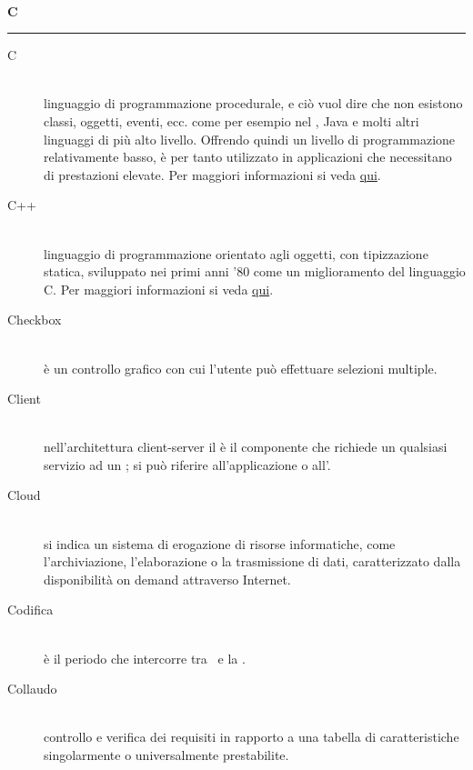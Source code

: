 \documentclass[12pt,a4paper]{article}
\begin{document}
\newpage

\begin{center}
\hfill\\
	\LARGE \textbf{C}
\hfill\\
\rule[15pt]{30pt}{0.5pt}
\end{center}

\begin{description}
\item[C]
\hfill\\ linguaggio di programmazione procedurale, e ciò vuol dire che non esistono classi, oggetti, eventi, ecc. come per esempio nel , Java e molti altri linguaggi di più alto livello. Offrendo quindi un livello di programmazione relativamente basso, è per tanto utilizzato in applicazioni che necessitano di prestazioni elevate. Per maggiori informazioni si veda \href{https://it.wikiversity.org/wiki/Linguaggio_C}{qui}.

\item[C++]
\hfill\\ linguaggio di programmazione orientato agli oggetti, con tipizzazione statica, sviluppato nei primi anni '80 come un miglioramento del linguaggio C. Per maggiori informazioni si veda \href{https://it.wikiversity.org/wiki/C\%2B\%2B}{qui}.

\item[Checkbox]
\hfill\\ è un controllo grafico con cui l'utente può effettuare selezioni multiple.

\item[Client]
\hfill\\nell'architettura client-server il  è il componente che richiede un qualsiasi servizio ad un ; si può riferire all'applicazione o all'.

\item[Cloud]
\hfill\\ si indica un sistema di erogazione di risorse informatiche, come l'archiviazione, l'elaborazione o la trasmissione di dati, caratterizzato dalla disponibilità on demand attraverso Internet.

\item[Codifica] 
\hfill\\ è il periodo che intercorre tra \RP\ e la \RQ.

\item[Collaudo] 
\hfill\\ controllo e verifica dei requisiti in rapporto a una tabella di caratteristiche singolarmente o universalmente prestabilite.


\end{description}
\end{document}
